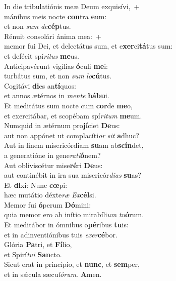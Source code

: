 \evenverse In die tribulatiónis meæ Deum exquisívi,~+\\\evenverse  mánibus meis nocte \textbf{con}tra \textbf{e}um:~\*\\
\evenverse et non \textit{sum} \textit{de}\textbf{cép}tus.\\
\oddverse Rénuit consolári ánima mea:~+\\
\oddverse  memor fui Dei, et delectátus sum, et e\textbf{xer}ci\textbf{tá}tus sum:~\*\\
\oddverse et defécit spí\textit{ri}\textit{tus} \textbf{me}us.\\
\evenverse Anticipavérunt vigílias \textbf{ó}culi \textbf{me}i:~\*\\
\evenverse turbátus sum, et non \textit{sum} \textit{lo}\textbf{cú}tus.\\
\oddverse Cogitávi \textbf{di}es an\textbf{tí}quos:~\*\\
\oddverse et annos ætérnos in \textit{men}\textit{te} \textbf{há}\textbf{bu}i.\\
\evenverse Et meditátus sum nocte cum \textbf{cor}de \textbf{me}o,~\*\\
\evenverse et exercitábar, et scopébam spí\textit{ri}\textit{tum} \textbf{me}um.\\
\oddverse Numquid in ætérnum pro\textbf{jí}ciet \textbf{De}us:~\*\\
\oddverse aut non appónet ut complacíti\textit{or} \textit{sit} \textbf{a}dhuc?\\
\evenverse Aut in finem misericórdiam \textbf{su}am ab\textbf{scín}det,~\*\\
\evenverse a generatióne in gene\textit{ra}\textit{ti}\textbf{ó}nem?\\
\oddverse Aut obliviscétur mise\textbf{ré}ri \textbf{De}us:~\*\\
\oddverse aut continébit in ira sua misericór\textit{di}\textit{as} \textbf{su}as?\\
\evenverse Et \textbf{di}xi: Nunc \textbf{cœ}pi:~\*\\
\evenverse hæc mutátio déxte\textit{ræ} \textit{Ex}\textbf{cél}si.\\
\oddverse Memor fui \textbf{ó}perum \textbf{Dó}mini:~\*\\
\oddverse quia memor ero ab inítio mirabíli\textit{um} \textit{tu}\textbf{ó}rum.\\
\evenverse Et meditábor in ómnibus o\textbf{pé}ribus \textbf{tu}is:~\*\\
\evenverse et in adinventiónibus tuis \textit{e}\textit{xer}\textbf{cé}bor.\\
\oddverse Glória \textbf{Pa}tri, et \textbf{Fí}lio,~\*\\
\oddverse et Spirí\textit{tu}\textit{i} \textbf{San}cto.\\
\evenverse Sicut erat in princípio, et \textbf{nunc}, et \textbf{sem}per,~\*\\
\evenverse et in sǽcula sæcu\textit{ló}\textit{rum}. \textbf{A}men.\\

